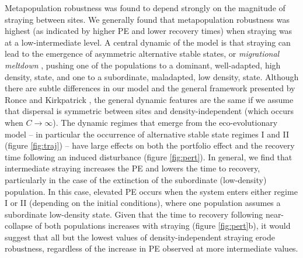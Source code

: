 \documentclass{revtex4}
\begin{document}
Metapopulation robustness was found to depend strongly on the magnitude of straying between sites.
We generally found that metapopulation robustness was highest (as indicated by higher PE and lower recovery times) when straying was at a low-intermediate level. 
A central dynamic of the model is that straying can lead to the emergence of asymmetric alternative stable states, or \emph{migrational meltdown} \citep{Ronce:2001dp}, pushing one of the populations to a dominant, well-adapted, high density, state, and one to a subordinate, maladapted, low density, state.
Although there are subtle differences in our model and the general framework presented by Ronce and Kirkpatrick \citep{Ronce:2001dp}, the general dynamic features are the same if we assume that dispersal is symmetric between sites and density-independent (which occurs when $C\rightarrow\infty$).
The dynamic regimes that emerge from the eco-evolutionary model -- in particular the occurrence of alternative stable state regimes I and II (figure \ref{fig:traj}) -- have large effects on both the portfolio effect and the recovery time following an induced disturbance (figure \ref{fig:pert}).
In general, we find that intermediate straying increases the PE and lowers the time to recovery, particularly in the case of the extinction of the subordinate (low-density) population.
In this case, elevated PE occurs when the system enters either regime I or II (depending on the initial conditions), where one population assumes a subordinate low-density state. 
Given that the time to recovery following near-collapse of both populations increases with straying (figure \ref{fig:pert}b), it would suggest that all but the lowest values of density-independent straying erode robustness, regardless of the increase in PE observed at more intermediate values.

\end{document}
